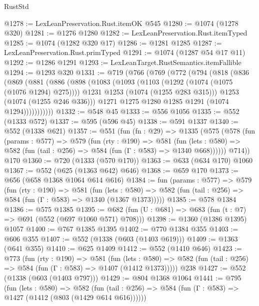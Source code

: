 \begin{lexlean}{RustStd}
\begin{coremodule}
@1278 := LexLeanPreservation.Rust.itemOK @545
@1280 := @1074 (@1278 @320)
@1281 := @1276 @1280
@1282 := LexLeanPreservation.Rust.itemTyped
@1285 := @1074 (@1282 @320 @17)
@1286 := @1281 @1285
@1287 := LexLeanPreservation.Rust.primTyped
@1291 := @1074 (@1287 @54 @17 @11)
@1292 := @1286 @1291
@1293 := LexLeanTarget.RustSemantics.itemFallible
@1294 := @1293 @320
@1331 := @719
    (@766
      (@769
        (@772
          (@794
            (@818
              (@836
                (@869
                  (@881
                    (@886
                      (@898
                        (@1083
                          (@1093
                            (@1103 (@1292 (@1074 (@1075 (@1076 @1294) @275))))
                            @1231
                            @1253
                            (@1074 (@1255 @283 @315)))
                          @1253
                          (@1074 (@1255 @246 @336)))
                        @1271
                        @1275
                        @1280
                        @1285
                        @1291
                        (@1074 @1294)))))))))))
@1332 := @548 @45
@1333 := @556 @1056
@1335 := @552 (@1333 @572)
@1337 := @595 (@596 @45)
@1338 := @591 @1337
@1340 := @552 (@1338 @621)
@1357 := @551
    (fun (fn : @29) =>
    @1335
      (@575
        (@578
          (fun (params : @577) =>
          @579
            (fun (rty : @190) =>
            @581
              (fun (lets : @580) =>
              @582 (fun (tail : @256) => @584 (fun (Γ : @583) => @1340 @668))))))
        @714))
    @170
@1360 := @720 (@1333 (@570 @170))
@1363 := @633 (@634 @170) @1060
@1367 := @552 (@625 (@1363 @642) @646)
@1368 := @659 @170
@1373 := @656 (@658 @1368 @1064 @614 @616)
@1384 := fun (params : @577) =>
  @579
    (fun (rty : @190) =>
    @581
      (fun (lets : @580) =>
      @582 (fun (tail : @256) => @584 (fun (Γ : @583) => @1340 (@1367 @1373)))))
@1385 := @578 @1384
@1386 := @575 @1385
@1395 := @682 (fun (U : @681) => @683 (fun (t : @7) => @691 (@552 (@697 @1060 @571) @708)))
@1398 := @1360 (@1386 @1395) @1057
@1400 := @767 @1385 @1395
@1402 := @770 @1384 @355
@1403 := @606 @355
@1407 := @552 (@1338 (@603 (@1403 @619)))
@1409 := @1363 (@641 @355)
@1410 := @625 @1409
@1412 := @552 (@1410 @646)
@1423 := @773
    (fun (rty : @190) =>
    @581
      (fun (lets : @580) =>
      @582 (fun (tail : @256) => @584 (fun (Γ : @583) => @1407 (@1412 @1373)))))
    @238
@1427 := @552 (@1338 (@603 (@1403 @797)))
@1429 := @804 @1368 @1064
@1441 := @795
    (fun (lets : @580) =>
    @582 (fun (tail : @256) => @584 (fun (Γ : @583) => @1427 (@1412 (@803 (@1429 @614 @616))))))

\end{coremodule}
\end{lexlean}
